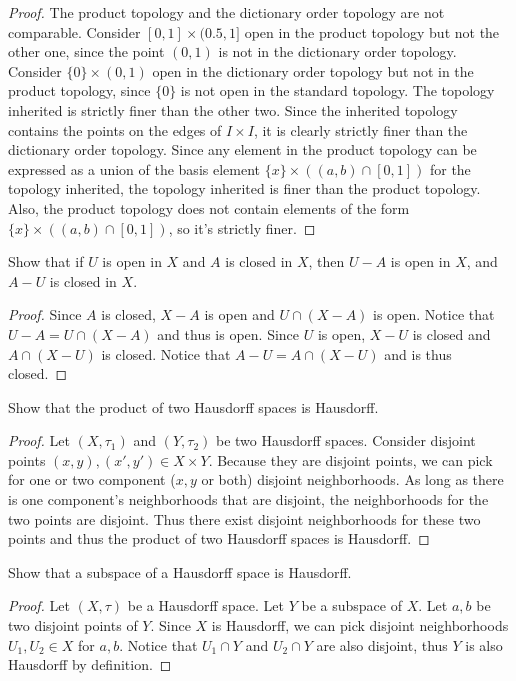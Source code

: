 \documentclass[12pt]{article}
\newenvironment{problem}[2][Problem]
{
	\begin{trivlist} 
		\item[\hskip \labelsep {\bfseries #1 #2:}]
	}
{
	\end{trivlist}
	}
\begin{document}
\begin{proof}
The product topology and the dictionary order topology are not comparable. Consider $[0, 1] \times (0.5, 1]$ open in the product topology but not the other one, since the point $(0, 1)$ is not in the dictionary order topology. Consider $\{0\} \times (0, 1)$ open in the dictionary order topology but not in the product topology, since $\{0\}$ is not open in the standard topology. The topology inherited is strictly finer than the other two. Since the inherited topology contains the points on the edges of $I \times I$, it is clearly strictly finer than the dictionary order topology. Since any element in the product topology can be expressed as a union of the basis element $\{x\} \times ((a,b) \cap [0,1])$ for the topology inherited, the topology inherited is finer than the product topology. Also, the product topology does not contain elements of the form $\{x\} \times ((a,b) \cap [0,1])$, so it's strictly finer.
\end{proof}

\newpage
\begin{problem}{17.4}
Show that if $U$ is open in $X$ and $A$ is closed in $X$, then $U-A$ is open in $X$, and $A-U$ is closed in $X$.
\end{problem}
\begin{proof}
Since $A$ is closed, $X - A$ is open and $U \cap (X - A)$ is open. Notice that $U-A = U \cap (X-A)$ and thus is open. Since $U$ is open, $X-U$ is closed and $A \cap (X-U)$ is closed. Notice that $A-U=A \cap (X-U)$ and is thus closed.
\end{proof}

\begin{problem}{17.11}
Show that the product of two Hausdorff spaces is Hausdorff.
\end{problem}
\begin{proof}
Let $(X, \tau_1)$ and $(Y, \tau_2)$ be two Hausdorff spaces. Consider disjoint points $(x, y), (x', y') \in X \times Y$. Because they are disjoint points, we can pick for one or two component ($x, y$ or both) disjoint neighborhoods. As long as there is one component's neighborhoods that are disjoint, the neighborhoods for the two points are disjoint. Thus there exist disjoint neighborhoods for these two points and thus the product of two Hausdorff spaces is Hausdorff.
\end{proof}

\begin{problem}{17.12}
Show that a subspace of a Hausdorff space is Hausdorff.
\end{problem}
\begin{proof}
Let $(X, \tau)$ be a Hausdorff space. Let $Y$ be a subspace of $X$. Let $a, b$ be two disjoint points of $Y$. Since $X$ is Hausdorff, we can pick disjoint neighborhoods $U_1, U_2 \in X$ for $a, b$. Notice that $U_1 \cap Y$ and $U_2 \cap Y$ are also disjoint, thus $Y$ is also Hausdorff by definition.
\end{proof}
\end{document}

